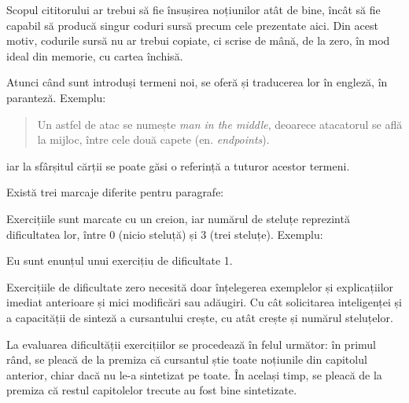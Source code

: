 Scopul cititorului ar trebui să fie însușirea noțiunilor atât de bine, încât
să fie capabil să producă singur coduri sursă precum cele prezentate aici. Din
acest motiv, codurile sursă nu ar trebui copiate, ci scrise de mână, de la zero,
în mod ideal din memorie, cu cartea închisă.

Atunci când sunt introduși termeni noi, se oferă și traducerea lor în engleză,
în paranteză.  Exemplu: \begin{quote} Un astfel de atac se numește \textsl{man
in the middle}, deoarece atacatorul se află la mijloc, între cele două
capete (en.  \textsl{endpoints}).  \end{quote} iar la sfârșitul cărții se poate
găsi o referință a tuturor acestor termeni.

Există trei marcaje diferite pentru paragrafe:




Exercițiile sunt marcate cu un creion, iar numărul de steluțe reprezintă
dificultatea lor, între 0 (nicio steluță) și 3 (trei steluțe). Exemplu:
\begin{Exercise*}[title={Exercițiu de dificultate 1},difficulty=1]

Eu sunt enunțul unui exercițiu de dificultate 1.

\end{Exercise*}

Exercițiile de dificultate zero necesită doar înțelegerea exemplelor și
explicațiilor imediat anterioare și mici modificări sau adăugiri.  Cu cât
solicitarea inteligenței și a capacității de sinteză a cursantului crește, cu
atât crește și numărul steluțelor.

La evaluarea dificultății exercițiilor se procedează în felul următor: în primul
rând, se pleacă de la premiza că cursantul știe toate noțiunile din capitolul
anterior, chiar dacă nu le-a sintetizat pe toate. În același timp, se pleacă de
la premiza că restul capitolelor trecute au fost bine sintetizate.


